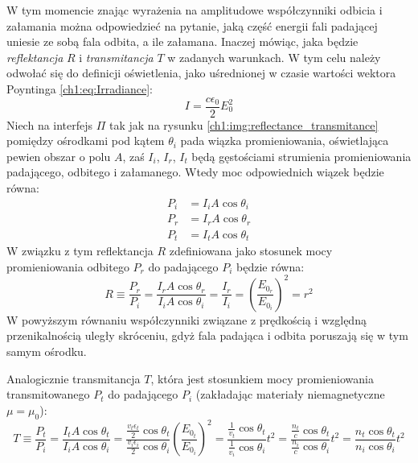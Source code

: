 
W tym momencie znając wyrażenia na amplitudowe współczynniki odbicia i załamania można odpowiedzieć na pytanie, jaką część energii fali padającej uniesie ze sobą fala odbita, a ile załamana. Inaczej mówiąc, jaka będzie \textit{reflektancja} $R$ i \textit{transmitancja} $T$ w zadanych warunkach. W tym celu należy odwołać się do definicji oświetlenia, jako uśrednionej w czasie wartości wektora Poyntinga \eqref{ch1:eq:Irradiance}:
\begin{equation}
I = \frac{c\epsilon_0}{2}E_0^2
\end{equation}
Niech na interfejs $\Pi$ tak jak na rysunku \ref{ch1:img:reflectance_transmitance} pomiędzy ośrodkami pod kątem $\theta_i$ pada wiązka promieniowania, oświetlająca pewien obszar o polu $A$, zaś $I_i$, $I_r$, $I_t$ będą gęstościami strumienia promieniowania padającego, odbitego i załamanego.
Wtedy moc odpowiednich wiązek będzie równa:
\begin{align*}
P_i &= I_iA\cos\theta_i\\
P_r &= I_rA\cos\theta_r\\
P_t &= I_tA\cos\theta_t
\end{align*}
W związku z tym reflektancja $R$ zdefiniowana jako stosunek mocy promieniowania odbitego $P_r$ do padającego $P_i$ będzie równa:
\begin{equation}
R\equiv\frac{P_r}{P_i}=\frac{I_rA\cos\theta_r}{I_iA\cos\theta_i}=\frac{I_r}{I_i} = \left( \frac{E_{0_r}}{E_{0_i}} \right)^2 = r^2
\label{ch1:eq:Reflectance}
\end{equation}
W powyższym równaniu współczynniki związane z prędkością i względną przenikalnością uległy skróceniu, gdyż fala padająca i odbita poruszają się w tym samym ośrodku.

Analogicznie transmitancja $T$, która jest stosunkiem mocy promieniowania transmitowanego $P_t$ do padającego $P_i$ (zakładając materiały niemagnetyczne $\mu=\mu_0$):
\begin{equation}
T\equiv\frac{P_t}{P_i}=\frac{I_tA\cos\theta_t}{I_iA\cos\theta_i}=\frac{\frac{v_t\epsilon_t}{2}\cos\theta_t}{\frac{v_i\epsilon_i}{2}\cos\theta_i}\left(\frac{E_{0_t}}{E_{0_i}} \right)^2 = \frac{\frac{1}{v_t}\cos\theta_t}{\frac{1}{v_i}\cos\theta_i}t^2 = \frac{\frac{n_t}{c}\cos\theta_t}{\frac{n_i}{c}\cos\theta_i}t^2 = \frac{n_t\cos\theta_t}{n_i\cos\theta_i}t^2
\label{ch1:eq:Transmitance}
\end{equation}

